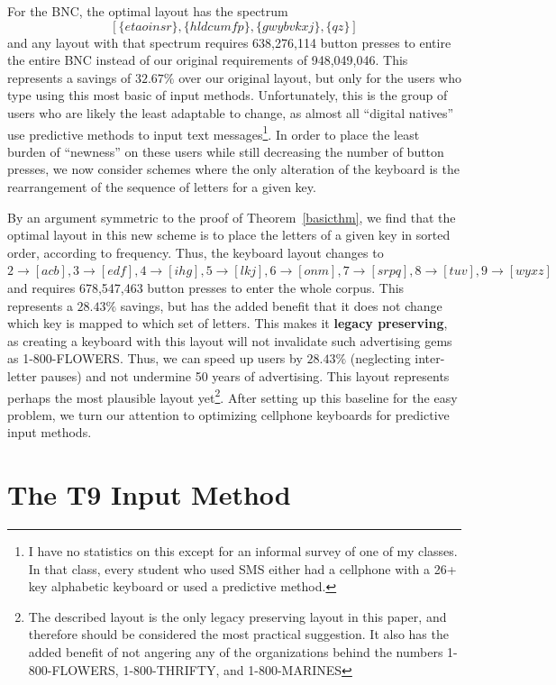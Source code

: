 \documentclass[runningheads]{llncs}
\newcommand{\newword}[1]{{\bf #1}}
\begin{document}
For the BNC, the optimal layout has the spectrum $$[\{etaoinsr\}, \{hldcumfp\},
\{gwybvkxj\}, \{qz\}]$$ and any layout with that spectrum requires 638,276,114
button presses to entire the entire BNC instead of our original requirements of
948,049,046.  This represents a savings of $32.67\%$ over our original layout,
but only for the users who type using this most basic of input methods.
Unfortunately, this is the group of users who are likely the least adaptable to
change, as almost all ``digital natives'' use predictive methods to input text
messages\footnote{I have no statistics on this except for an informal survey of
one of my classes.  In that class, every student who used SMS either had a
cellphone with a 26+ key alphabetic keyboard or used a predictive method.}.  In
order to place the least burden of ``newness'' on these users while still
decreasing the number of button presses, we now consider schemes where the only
alteration of the keyboard is the rearrangement of the sequence of letters for
a given key.

By an argument symmetric to the proof of Theorem~\ref{basicthm}, we find that
the optimal layout in this new scheme is to place the letters of a given key in
sorted order, according to frequency.  Thus, the keyboard layout changes to
$2\to[acb], 3\to[edf], 4\to[ihg], 5\to[lkj], 6\to[onm], 7\to[srpq], 8\to[tuv],
9\to[wyxz]$ and requires 678,547,463 button presses to enter the whole corpus.
This represents a $28.43\%$ savings, but has the added benefit that it does not
change which key is mapped to which set of letters.  This makes it
\newword{legacy preserving}, as creating a keyboard with this layout will not
invalidate such advertising gems as 1-800-FLOWERS.  Thus, we can speed up users
by $28.43\%$ (neglecting inter-letter pauses) and not undermine 50 years of
advertising.  This layout represents perhaps the most plausible layout
yet\footnote{The described layout is the only legacy preserving layout in this
paper, and therefore should be considered the most practical suggestion.  It
also has the added benefit of not angering any of the organizations behind the
numbers 1-800-FLOWERS, 1-800-THRIFTY, and 1-800-MARINES}.  After setting up
this baseline for the easy problem, we turn our attention to optimizing
cellphone keyboards for predictive input methods.

\section{The T9 Input Method}
\end{document}
